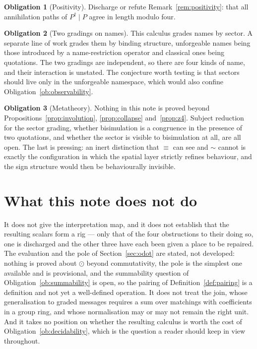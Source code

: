 \documentclass[11pt]{article}
\theoremstyle{definition}
\newtheorem{obligation}{Obligation}
\theoremstyle{remark}
\newcommand{\scong}{\ensuremath{\equiv}}
\begin{document}
\begin{obligation}[Positivity]
Discharge or refute Remark~\ref{rem:positivity}: that all annihilation paths of
$P^\dagger \mid P$ agree in length modulo four.
\end{obligation}

\begin{obligation}[Two gradings on names]
This calculus grades names by sector. A separate line of work grades them by
binding structure, unforgeable names being those introduced by a name-restriction
operator and classical ones being quotations. The two gradings are independent,
so there are four kinds of name, and their interaction is unstated. The
conjecture worth testing is that sectors should live only in the unforgeable
namespace, which would also confine Obligation~\ref{ob:observability}.
\end{obligation}

\begin{obligation}[Metatheory]
Nothing in this note is proved beyond Propositions~\ref{prop:involution},
\ref{prop:collapse} and~\ref{prop:z4}. Subject reduction for the sector grading,
whether bisimulation is a congruence in the presence of two quotations, and
whether the sector is visible to bisimulation at all, are all open. The last is
pressing: an inert distinction that $\scong$ can see and $\sim$ cannot is exactly
the configuration in which the spatial layer strictly refines behaviour, and the
sign structure would then be behaviourally invisible.
\end{obligation}

\section{What this note does not do}

It does not give the interpretation map, and it does not establish that the
resulting scalars form a rig --- only that of the four obstructions to their
doing so, one is discharged and the other three have each been given a place to
be repaired. The evaluation and the pole of
Section~\ref{sec:odot} are stated, not developed: nothing is proved about
$\odot$ beyond commutativity, the pole is the simplest one available and is
provisional, and the summability question of Obligation~\ref{ob:summability} is
open, so the pairing of Definition~\ref{def:pairing} is a definition and not yet
a well-defined operation. It does not treat the join, whose generalisation to
graded messages requires a sum over matchings with coefficients in a group ring,
and whose normalisation may or may not remain the right unit. And it takes no
position on whether the resulting calculus is worth the cost of
Obligation~\ref{ob:decidability}, which is the question a reader should keep in
view throughout.
\end{document}
